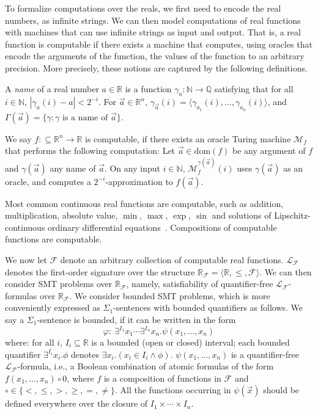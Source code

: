 \documentclass[envcountsect]{llncs}
\newcommand{\dom}{\mathrm{dom}}
\begin{document}
To formalize computations over the reals, we first need to encode the real
numbers, as infinite strings. We can then model
computations of real functions with machines that can use infinite strings as
input and output. That is, a real function is computable if there exists a
machine that computes, using oracles that encode the arguments of the function,
the values of the function to an arbitrary precision. More precisely, these
notions are captured by the following definitions.
\begin{definition}
A {\em name} of a real number $a\in \mathbb{R}$ is a function
$\mathcal{\gamma}_a: \mathbb{N}\rightarrow \mathbb{Q}$ satisfying that for all
$i\in \mathbb{N}$, $|\gamma_a(i) - a|<2^{-i}.$ For $\vec a\in \mathbb{R}^n$,
$\gamma_{\vec a}(i) = \langle \gamma_{a_1}(i), ..., \gamma_{a_n}(i)\rangle$, and
$\Gamma(\vec a) = \{\gamma: \gamma\mbox{ is a name of }\vec a\}$.
\end{definition}
\begin{definition} We say
$f:\subseteq\mathbb{R}^n\rightarrow \mathbb{R}$ is computable, if there exists
an oracle Turing machine $\mathcal{M}_f$ that performs the following
computation: Let $\vec a\in \dom(f)$ be any argument of $f$ and $\gamma(\vec a)$
any name of $\vec a$. On any input $i\in \mathbb{N}$,
$\mathcal{M}_f^{\gamma(\vec a)}(i)$ uses $\gamma(\vec a)$ as an oracle, and
computes a $2^{-i}$-approximation to $f(\vec a)$.
\end{definition}
Most common continuous real functions are computable, such as addition,
multiplication,  absolute value, $\min$, $\max$, $\exp$, $\sin$ and solutions of
Lipschitz-continuous ordinary differential equations~\cite{CAbook}. Compositions
of computable functions are computable.

We now let $\mathcal{F}$ denote an arbitrary collection of computable real
functions. $\mathcal{L}_{\mathcal{F}}$ denotes the first-order signature over
the structure $\mathbb{R}_{\mathcal{F}} = \langle
\mathbb{R}, \leq, \mathcal{F}\rangle$. We can then consider SMT problems
over $\mathbb{R}_{\mathcal{F}}$, namely, satisfiability of quantifier-free
$\mathcal{L}_{\mathcal{F}}$-formulas over $\mathbb{R}_{\mathcal{F}}$. We
consider bounded SMT problems, which is more conveniently expressed as
$\Sigma_1$-sentences with bounded quantifiers as follows. We say a
$\Sigma_1$-sentence is bounded, if it can be written in the form
$$\varphi:\ \exists^{I_1}x_1\cdots \exists^{I_n}x_n. \psi(x_1,...,x_n)$$
where: for all $i$, $I_i\subseteq \mathbb{R}$ is a bounded (open or closed)
interval; each bounded quantifier $\exists^{I_i}x_i.\phi$ denotes $\exists
x_i.(x_i\in I_i\wedge \phi)$. $\psi(x_1,...,x_n)$ is a quantifier-free
$\mathcal{L}_{\mathcal{F}}$-formula, i.e., a Boolean combination of atomic
formulas of the form $f(x_1,...,x_n)\circ 0$, where $f$ is a composition of
functions in $\mathcal{F}$ and $\circ\in\{<,\leq, >, \geq, =, \neq \}$.
All the functions occurring in $\psi(\vec x)$ should be defined everywhere over
the closure of $I_1\times\cdots \times I_n$.
\end{document}
